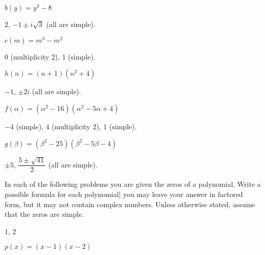 \begin{exercises}
\begin{problem}[Zeros]
\begin{multicols}{3}
\begin{subproblem}
			 $b(y)=y^3-8$
			 \begin{shortsolution}
				 $2$, $-1\pm i\sqrt{3}$ (all are simple).
			 \end{shortsolution}
		 \end{subproblem}
		 \begin{subproblem}
			 $c(m)=m^3-m^2$
			 \begin{shortsolution}
				 $0$ (multiplicity $2$), $1$ (simple).
			 \end{shortsolution}
		 \end{subproblem}
		 \begin{subproblem}
			 $h(n)=(n+1)(n^2+4)$
			 \begin{shortsolution}
				 $-1$, $\pm 2i$ (all are simple).
			 \end{shortsolution}
		 \end{subproblem}
		 \begin{subproblem}
			 $f(\alpha)=(\alpha^2-16)(\alpha^2-5\alpha+4)$
			 \begin{shortsolution}
				 $-4$ (simple), $4$ (multiplicity $2$), $1$ (simple).
			 \end{shortsolution}
		 \end{subproblem}
		 \begin{subproblem}
			 $g(\beta)=(\beta^2-25)(\beta^2-5\beta-4)$
			 \begin{shortsolution}
				 $\pm 5$, $\dfrac{5\pm\sqrt{41}}{2}$ (all are simple).
			 \end{shortsolution}
		 \end{subproblem}
	 \end{multicols}
	 \end{problem}
	 \begin{problem}
	 In each of the following problems you are given the zeros of a polynomial.
	 Write a possible formula for each polynomial| you may leave your
	 answer in factored form, but it may not contain complex numbers. Unless
	 otherwise stated, assume that the zeros are simple.
	 \begin{multicols}{3}
		 \begin{subproblem}
			 $1$, $2$
			 \begin{shortsolution}
				 $p(x)=(x-1)(x-2)$
			 \end{shortsolution}
		 \end{subproblem}
		 \begin{subproblem}

\end{subproblem}
\end{multicols}
\end{problem}
\end{exercises}
